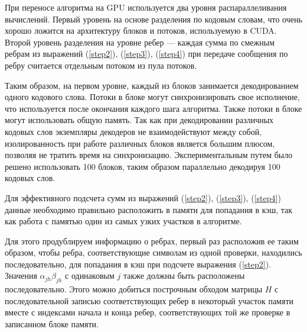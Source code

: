 При переносе алгоритма на GPU используется два уровня распараллеливания вычислений. Первый уровень на
основе разделения по кодовым словам, что очень хорошо ложится на архитектуру блоков и потоков, используемую
в CUDA. Второй уровень разделения на уровне ребер --- каждая сумма по смежным ребрам из выражений
(\ref{step2}), (\ref{step3}), (\ref{step4}) при передаче сообщения
по ребру считается отдельным потоком из пула потоков.

Таким образом, на первом уровне, каждый из блоков занимается декодированием одного кодового слова.
Потоки в блоке могут синхронизировать свое исполнение, что используется после окончания каждого шага
алгоритма. Также потоки в блоке могут использовать общую память. Так как при декодировании различных
кодовых слов экземпляры декодеров не взаимодействуют между собой, изолированность при работе различных
блоков является большим плюсом, позволяя не тратить время на синхронизацию. Экспериментальным путем
было решено использовать 100 блоков, таким образом параллельно декодируя 100 кодовых слов.

Для эффективного подсчета сумм из выражений (\ref{step2}), (\ref{step3}), (\ref{step4}) данные необходимо
правильно расположить в памяти для попадания в кэш, так как работа с памятью один из самых узких 
участков в алгоритме. 

Для этого продублируем информацию о ребрах, первый раз расположив ее таким образом,
чтобы ребра, соответствующие символам из одной проверки, находились последовательно, для попадания в кэш
при подсчете выражения (\ref{step2}). Значения $\alpha_{jh}\beta_{jh}$ с одинаковым $j$ также должны быть
расположены последовательно. Этого можно добиться построчным обходом матрицы $H$ с последовательной записью
соответствующих ребер в некоторый участок памяти вместе с индексами начала и конца ребер, соответствующих той же проверке в записанном блоке памяти.

